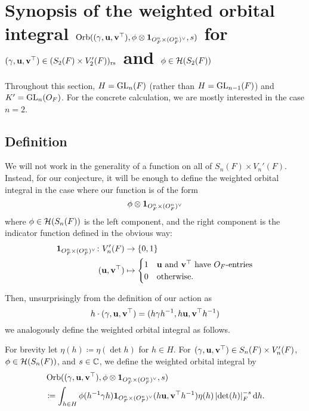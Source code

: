 \chapter{Synopsis of the weighted orbital integral
  $\operatorname{Orb}((\gamma, \mathbf u, \mathbf v^\top), \phi \otimes \mathbf{1}_{O_F^n \times (O_F^n)^\vee}, s)$
  for $(\gamma, \mathbf u, \mathbf v^\top) \in (S_2(F) \times V'_2(F))_{\mathrm{rs}}$
  and $\phi \in \mathcal H(S_2(F))$}
\label{ch:orbitalFJ0}

Throughout this section, $H = \operatorname{GL}_n(F)$ (rather than $H = \operatorname{GL}_{n-1}(F)$)
and $K' = \operatorname{GL}_n(O_F)$.
For the concrete calculation, we are mostly interested in the case $n = 2$.

\section{Definition}
We will not work in the generality of a function on all of $S_n(F) \times V_n'(F)$.
Instead, for our conjecture, it will be enough to define the weighted orbital integral
in the case where our function is of the form
\[ \phi \otimes \mathbf{1}_{O_F^n \times (O_F^n)^\vee} \]
where $\phi \in \mathcal H(S_n(F))$ is the left component, and
the right component is the indicator function defined in the obvious way:
\begin{align*}
  \mathbf{1}_{O_F^n \times (O_F^n)^\vee} \colon V'_n(F) &\to \{0,1\} \\
  (\mathbf u, \mathbf v^\top) &\mapsto
  \begin{cases}
    1 & \mathbf u \text{ and } \mathbf v^\top \text{ have } O_F \text{-entries} \\
    0 & \text{otherwise}.
  \end{cases}
\end{align*}

Then, unsurprisingly from the definition of our action as
\[ h \cdot {(\gamma, \mathbf u, \mathbf v^\top)} = (h\gamma h^{-1}, h\mathbf u, \mathbf v^\top h^{-1}) \]
we analogously define the weighted orbital integral as follows.
\begin{definition}
  For brevity let $\eta(h) \coloneqq \eta(\det h)$ for $h \in H$.
  For ${(\gamma, \mathbf u, \mathbf v^\top)} \in S_n(F) \times V'_n(F)$,
  $\phi \in \mathcal H(S_n(F))$, and $s \in \mathbb C$,
  we define the weighted orbital integral by
  \begin{align*}
    & \Orb((\gamma, \uu, \vv^\top), \phi \otimes \oneV, s) \\
    &\coloneqq \int_{h \in H} \phi(h\inv \gamma h) \oneV(h \uu, \vv^\top h^{-1})
    \eta(h) \left\lvert \det(h) \right\rvert_F^{-s} \odif h.
  \end{align*}
  \label{def:orbitalFJ}
\end{definition}


